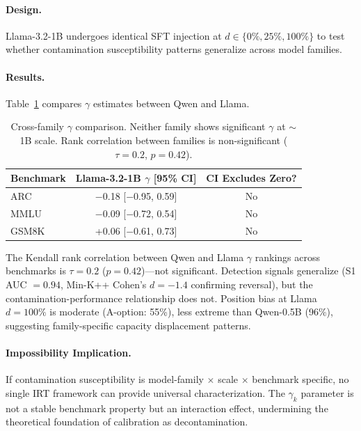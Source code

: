 \documentclass[11pt,a4paper]{article}
\begin{document}
\paragraph{Design.} Llama-3.2-1B undergoes identical SFT injection at $d \in \{0\%, 25\%, 100\%\}$ to test whether contamination susceptibility patterns generalize across model families.

\paragraph{Results.} Table~\ref{tab:family} compares $\gamma$ estimates between Qwen and Llama.

\begin{table}[h]
\centering
\caption{Cross-family $\gamma$ comparison. Neither family shows significant $\gamma$ at $\sim$1B scale. Rank correlation between families is non-significant ($\tau = 0.2$, $p = 0.42$).}
\label{tab:family}
\begin{tabular}{lcc}
\toprule
Benchmark & Llama-3.2-1B $\gamma$ [95\% CI] & CI Excludes Zero? \\
\midrule
ARC & $-$0.18 [$-$0.95, 0.59] & No \\
MMLU & $-$0.09 [$-$0.72, 0.54] & No \\
GSM8K & +0.06 [$-$0.61, 0.73] & No \\
\bottomrule
\end{tabular}
\end{table}

The Kendall rank correlation between Qwen and Llama $\gamma$ rankings across benchmarks is $\tau = 0.2$ ($p = 0.42$)---not significant. Detection signals generalize (S1 AUC $= 0.94$, Min-K++ Cohen's $d = -1.4$ confirming reversal), but the contamination-performance relationship does not. Position bias at Llama $d=100\%$ is moderate (A-option: 55\%), less extreme than Qwen-0.5B (96\%), suggesting family-specific capacity displacement patterns.

\paragraph{Impossibility Implication.} If contamination susceptibility is model-family $\times$ scale $\times$ benchmark specific, no single IRT framework can provide universal characterization. The $\gamma_k$ parameter is not a stable benchmark property but an interaction effect, undermining the theoretical foundation of calibration as decontamination.

\end{document}
